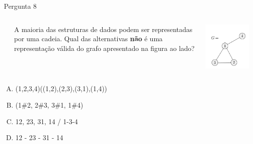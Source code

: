\documentclass[xcolor=dvipsnames,table]{beamer}
\begin{document}
	\begin{frame}
		\begin{block}{Pergunta 8}
			
			\begin{columns}
				\begin{column}{0.05\textwidth}\end{column}
				\begin{column}{0.45\textwidth}
					A maioria das estruturas de dados podem ser representadas por uma cadeia. Qual das alternativas {\bf não} é uma representação válida do grafo apresentado na figura ao lado?
				\end{column}
				\begin{column}{0.5\textwidth}  %
					\begin{center}
						\includegraphics[width=.6\textwidth]{images/grafo}
					\end{center}
				\end{column}
			\end{columns}
			\begin{center}
				
			\end{center}
		\end{block}
		\begin{enumerate}[(A)]
			\item (1,2,3,4)((1,2),(2,3),(3,1),(1,4)) 
			\item (1\#2, 2\#3, 3\#1, 1\#4)
			\item 12, 23, 31, 14 / 1-3-4
			\item 12 - 23 - 31 - 14
		\end{enumerate}
	\end{frame}
	
	\begin{frame}
		\titlepage
	\end{frame}
	
\end{document}

